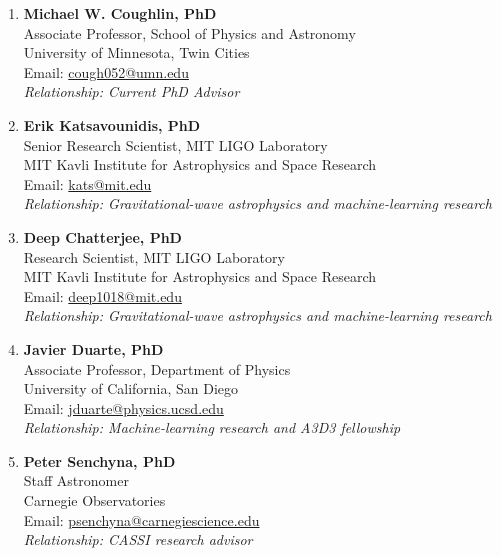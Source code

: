 \documentclass[a4paper,11pt]{article}
\begin{document}
\small{
\begin{enumerate}[leftmargin=*, labelsep=2mm]

\item \textbf{Michael W. Coughlin, PhD}\\
   Associate Professor, School of Physics and Astronomy\\
   University of Minnesota, Twin Cities\\
   Email: \href{mailto:cough052@umn.edu}{cough052@umn.edu}\\
   \textit{Relationship: Current PhD Advisor}

\item \textbf{Erik Katsavounidis, PhD}\\
   Senior Research Scientist, MIT LIGO Laboratory\\
   MIT Kavli Institute for Astrophysics and Space Research\\
   Email: \href{mailto:kats@mit.edu}{kats@mit.edu}\\
   \textit{Relationship: Gravitational-wave astrophysics and machine-learning research}

\item \textbf{Deep Chatterjee, PhD}\\
   Research Scientist, MIT LIGO Laboratory\\
   MIT Kavli Institute for Astrophysics and Space Research\\
   Email: \href{mailto:deep1018@mit.edu}{deep1018@mit.edu}\\
   \textit{Relationship: Gravitational-wave astrophysics and machine-learning research}

\item \textbf{Javier Duarte, PhD}\\
   Associate Professor, Department of Physics\\
   University of California, San Diego\\
   Email: \href{mailto:jduarte@physics.ucsd.edu}{jduarte@physics.ucsd.edu}\\
   \textit{Relationship: Machine-learning research and A3D3 fellowship}

\item \textbf{Peter Senchyna, PhD}\\
   Staff Astronomer\\
   Carnegie Observatories\\
   Email: \href{mailto:psenchyna@carnegiescience.edu}{psenchyna@carnegiescience.edu}\\
   \textit{Relationship: CASSI research advisor}

\end{enumerate}
}
\end{document}

